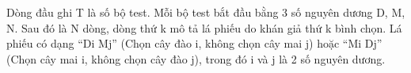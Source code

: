 Dòng đầu ghi T là số bộ test. Mỗi bộ test bắt đầu bằng 3 số nguyên dương D, M, N. Sau đó là N dòng, dòng thứ k mô tả lá phiếu do khán giả thứ k bình chọn. Lá phiếu có dạng “Di Mj” (Chọn cây đào i, không chọn cây mai j) hoặc “Mi Dj” (Chọn cây mai i, không chọn cây đào j), trong đó i và j là 2 số nguyên dương.